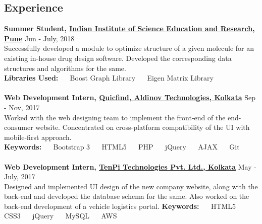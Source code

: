 \documentclass[margin, centered]{res}
\begin{document}
\begin{resume}
\section{Experience}
\textbf{Summer Student, \href{http://www.iiserpune.ac.in/}{Indian Institute of Science Education and Research, Pune}} \hfill{Jun - July, 2018}\\
Successfully developed a module to optimize structure of a given molecule for an existing in-house drug design software. Developed the corresponding data structures and algorithms for the same.\\
\textbf{Libraries Used:} ~\textbullet~ Boost Graph Library ~\textbullet~ Eigen Matrix Library\\
\\
\textbf{Web Development Intern, \href{http://www.quicfind.com}{Quicfind, Aldinov Technologies, Kolkata}} \hfill Sep - Nov, 2017\\
Worked with the web designing team to implement the front-end of the end-consumer website. Concentrated on cross-platform compatibility of the UI with mobile-first approach.\\
\textbf{Keywords:} ~\textbullet~ Bootstrap 3 ~\textbullet~ HTML5 ~\textbullet~ PHP ~\textbullet~ jQuery ~\textbullet~ AJAX ~\textbullet~ Git\\
\\
\textbf{Web Development Intern, \href{http://www.tenpitech.com/}{TenPi Technologies Pvt. Ltd., Kolkata}} \hfill May - July, 2017\\
Designed and implemented UI design of the new company website, along with the back-end and developed the database schema for the same. Also worked on the back-end development of a vehicle logistics portal.
\textbf{Keywords:} ~\textbullet~ HTML5 ~\textbullet~ CSS3 ~\textbullet~ jQuery ~\textbullet~ MySQL ~\textbullet~ AWS


\end{resume}
\end{document}
